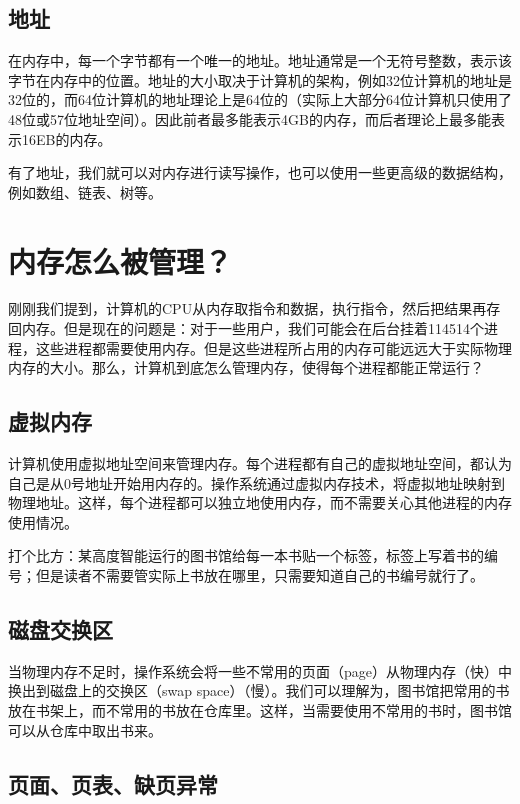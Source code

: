 \subsection{地址}

在内存中，每一个字节都有一个唯一的地址。地址通常是一个无符号整数，表示该字节在内存中的位置。地址的大小取决于计算机的架构，例如32位计算机的地址是32位的，而64位计算机的地址理论上是64位的（实际上大部分64位计算机只使用了48位或57位地址空间）。因此前者最多能表示4GB的内存，而后者理论上最多能表示16EB的内存。

有了地址，我们就可以对内存进行读写操作，也可以使用一些更高级的数据结构，例如数组、链表、树等。

\section{内存怎么被管理？}

刚刚我们提到，计算机的CPU从内存取指令和数据，执行指令，然后把结果再存回内存。但是现在的问题是：对于一些用户，我们可能会在后台挂着114514个进程，这些进程都需要使用内存。但是这些进程所占用的内存可能远远大于实际物理内存的大小。那么，计算机到底怎么管理内存，使得每个进程都能正常运行？

\subsection{虚拟内存}

计算机使用虚拟地址空间来管理内存。每个进程都有自己的虚拟地址空间，都认为自己是从0号地址开始用内存的。操作系统通过虚拟内存技术，将虚拟地址映射到物理地址。这样，每个进程都可以独立地使用内存，而不需要关心其他进程的内存使用情况。

打个比方：某高度智能运行的图书馆给每一本书贴一个标签，标签上写着书的编号；但是读者不需要管实际上书放在哪里，只需要知道自己的书编号就行了。

\subsection{磁盘交换区}

当物理内存不足时，操作系统会将一些不常用的页面（page）从物理内存（快）中换出到磁盘上的交换区（swap space）（慢）。我们可以理解为，图书馆把常用的书放在书架上，而不常用的书放在仓库里。这样，当需要使用不常用的书时，图书馆可以从仓库中取出书来。

\subsection{页面、页表、缺页异常}

